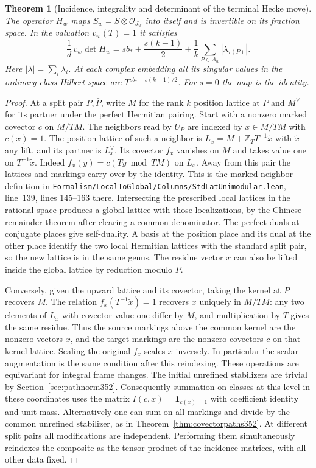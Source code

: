 \documentclass[a4paper,11pt]{article}
\newtheorem{theorem}[proposition]{Theorem}
\theoremstyle{definition}
\theoremstyle{remark}
\newcommand{\srcloc}[2]{{\small\nolinkurl{#1.lean}}, line~#2}
\numberwithin{equation}{section}
\begin{document}
\begin{theorem}[Incidence, integrality and determinant of the terminal Hecke move]\leavevmode
\label{thm:neighbormove356}
The operator \(H_w\) maps \(S_w=S\otimes\mathcal O_{J_w}\)
into itself and is invertible on its fraction space. In the
valuation \(v_w(T)=1\) it satisfies
\[
 \frac1d\,v_w\det H_w
      =s b_*+\frac{s(k-1)}2+
           \frac1k\sum_{P\in A_w}|\lambda_{\tau(P)}|.
\]
Here \(|\lambda|=\sum_i\lambda_i\). At each complex embedding
all its singular values in the ordinary class Hilbert space
are \(T^{s b_*+s(k-1)/2}\). For \(s=0\) the map is the identity.
\end{theorem}
\begin{proof}
At a split pair \(P,\bar P\), write \(M\) for the rank \(k\)
position lattice at \(P\) and \(M^\vee\) for its partner under
the perfect Hermitian pairing. Start with a nonzero marked
covector \(c\) on \(M/TM\). The neighbors read by \(U_P\)
are indexed by \(x\in M/TM\) with \(c(x)=1\). The position
lattice of such a neighbor is \(L_x=M+\mathbb Z_T T^{-1}\tilde x\)
with \(\tilde x\) any lift, and its partner is \(L_x^\vee\).
Its covector \(f_x\) vanishes on \(M\) and takes value one on
\(T^{-1}\tilde x\). Indeed \(f_x(y)=c(Ty\bmod TM)\) on \(L_x\).
Away from this pair the lattices and markings carry over by the
identity. This is the marked neighbor definition in
\srcloc{Formalism/LocalToGlobal/Columns/StdLatUnimodular}{139},
lines 145--163 there. Intersecting the prescribed local
lattices in the rational space produces a global lattice with
those localizations, by the Chinese remainder theorem after
clearing a common denominator. The perfect duals at conjugate
places give self-duality. A basis at the position place and its
dual at the other place identify the two local Hermitian
lattices with the standard split pair, so the new lattice is
in the same genus. The residue vector \(x\) can also be lifted
inside the global lattice by reduction modulo \(P\).

Conversely, given the upward lattice and its covector, taking
the kernel at \(P\) recovers \(M\). The relation
\(f_x(T^{-1}\tilde x)=1\) recovers \(x\) uniquely in \(M/TM\):
any two elements of \(L_x\) with covector value one differ by
\(M\), and multiplication by \(T\) gives the same residue.
Thus the source markings above the common kernel are the nonzero
vectors \(x\), and the target markings are the nonzero covectors
\(c\) on that kernel lattice. Scaling the original \(f_x\)
scales \(x\) inversely. In particular the scalar augmentation
is the same condition after this reindexing. These operations
are equivariant for integral frame changes. The initial
unrefined stabilizers are trivial by Section~\ref{sec:pathnorm352}.
Consequently summation on classes at this level in these
coordinates uses the matrix \(I(c,x)=\mathbf1_{c(x)=1}\)
with coefficient identity and unit mass. Alternatively one can
sum on all markings and divide by the common unrefined
stabilizer, as in Theorem~\ref{thm:covectorpaths352}.
At different split pairs all modifications are independent.
Performing them simultaneously reindexes the composite as
the tensor product of the incidence matrices, with all other
data fixed.


\end{proof}
\end{document}
